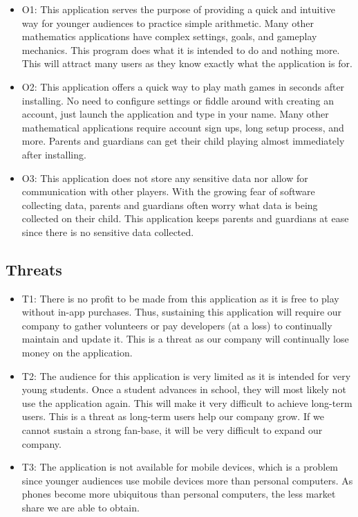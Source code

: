\documentclass[12pt]{article}
\begin{document}
\begin{itemize}
\item O1: This application serves the purpose of providing a quick and intuitive way for younger audiences to practice simple arithmetic. Many other mathematics applications have complex settings, goals, and gameplay mechanics. This program does what it is intended to do and nothing more. This will attract many users as they know exactly what the application is for.
\item O2: This application offers a quick way to play math games in seconds after installing. No need to configure settings or fiddle around with creating an account, just launch the application and type in your name. Many other mathematical applications require account sign ups, long setup process, and more. Parents and guardians can get their child playing almost immediately after installing. 
\item O3: This application does not store any sensitive data nor allow for communication with other players. With the growing fear of software collecting data, parents and guardians often worry what data is being collected on their child. This application keeps parents and guardians at ease since there is no sensitive data collected. 
\end{itemize}

\subsection{Threats}

\begin{itemize}
\item T1: There is no profit to be made from this application as it is free to play without in-app purchases. Thus, sustaining this application will require our company to gather volunteers or pay developers (at a loss) to continually maintain and update it. This is a threat as our company will continually lose money on the application.
\item T2: The audience for this application is very limited as it is intended for very young students. Once a student advances in school, they will most likely not use the application again. This will make it very difficult to achieve long-term users. This is a threat as long-term users help our company grow. If we cannot sustain a strong fan-base, it will be very difficult to expand our company.  
\item T3: The application is not available for mobile devices, which is a problem since younger audiences use mobile devices more than personal computers. As phones become more ubiquitous than personal computers, the less market share we are able to obtain. 
\end{itemize}
\end{document}
